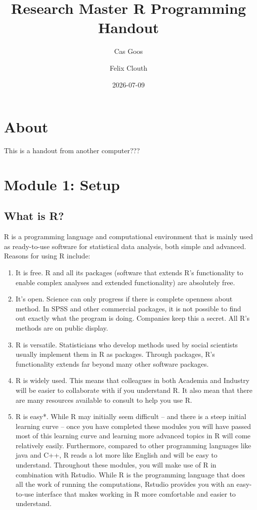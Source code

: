 \documentclass[
]{book}
\title{Research Master R Programming Handout}
\author{Cas Goos \and Felix Clouth}
\date{2026-07-09}
\begin{document}
\maketitle

{
\setcounter{tocdepth}{1}
\tableofcontents
}
\chapter{About}\label{about}

This is a handout from another computer???

\chapter{Module 1: Setup}\label{module-1-setup}

\section{What is R?}\label{what-is-r}

R is a programming language and computational environment that is mainly used as ready-to-use software for statistical data analysis, both simple and advanced. Reasons for using R include:

\begin{enumerate}
\def\labelenumi{\arabic{enumi}.}
\item
  It is free. R and all its packages (software that extends R's functionality to enable complex analyses and extended functionality) are absolutely free.
\item
  It's open. Science can only progress if there is complete openness about method. In SPSS and other commercial packages, it is not possible to find out exactly what the program is doing. Companies keep this a secret. All R's methods are on public display.
\item
  R is versatile. Statisticians who develop methods used by social scientists usually implement them in R as packages. Through packages, R's functionality extends far beyond many other software packages.
\item
  R is widely used. This means that colleagues in both Academia and Industry will be easier to collaborate with if you understand R. It also mean that there are many resources available to consult to help you use R.
\item
  R is easy*. While R may initially seem difficult -- and there is a steep initial learning curve -- once you have completed these modules you will have passed most of this learning curve and learning more advanced topics in R will come relatively easily. Furthermore, compared to other programming languages like java and C++, R reads a lot more like English and will be easy to understand. Throughout these modules, you will make use of R in combination with Rstudio. While R is the programming language that does all the work of running the computations, Rstudio provides you with an easy-to-use interface that makes working in R more comfortable and easier to understand.
\end{enumerate}
\end{document}

